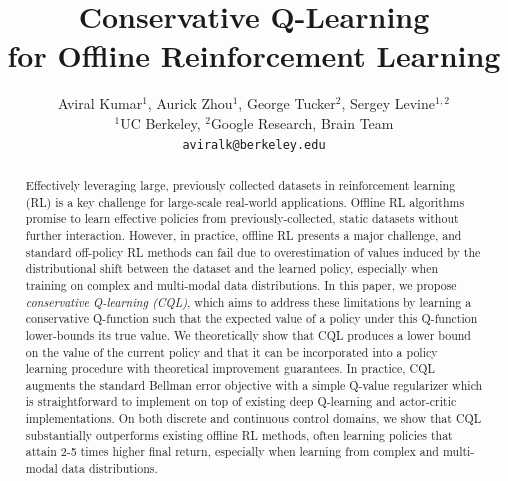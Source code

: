 \documentclass{article}
\title{Conservative Q-Learning\\ for Offline Reinforcement Learning}
\author{%
  Aviral Kumar$^1$, Aurick Zhou$^1$, George Tucker$^2$, Sergey Levine$^{1,2}$ \\
  $^1$UC Berkeley, $^2$Google Research, Brain Team\\
  \texttt{aviralk@berkeley.edu}
}
\begin{document}
\maketitle

\begin{abstract}
Effectively leveraging large, previously collected datasets in reinforcement learning (RL) is a key challenge for large-scale real-world applications. Offline RL algorithms promise to learn effective policies from previously-collected, static datasets without further interaction. However, in practice, offline RL presents a major challenge, and standard off-policy RL methods can fail due to overestimation of values induced by the distributional shift between the dataset and the learned policy, especially when training on complex and multi-modal data distributions. In this paper, we propose \emph{conservative Q-learning (CQL)}, which aims to address these limitations by learning a conservative Q-function such that the expected value of a policy under this Q-function lower-bounds its true value. 
We theoretically show that CQL produces a lower bound on the value of the current policy and that it can be incorporated into a policy learning procedure with theoretical improvement guarantees. In practice, CQL augments the standard Bellman error objective with a simple Q-value regularizer which is straightforward to implement on top of existing deep Q-learning and actor-critic implementations. On both discrete and continuous control domains, we show that CQL substantially outperforms existing offline RL methods, often learning policies that attain 2-5 times higher final return, especially when learning from complex and multi-modal data distributions.
\end{abstract}








\vspace{-8pt}
\end{document}
